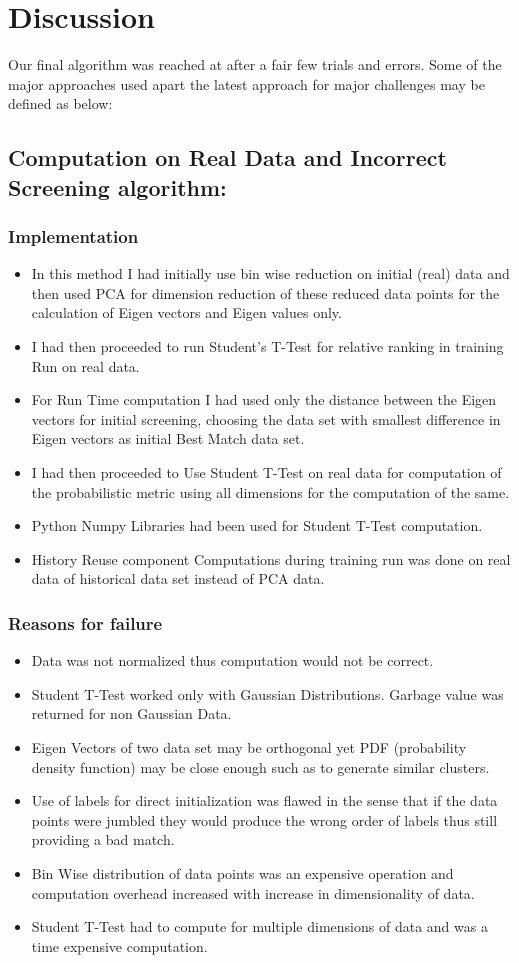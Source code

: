 \section{Discussion}
Our final algorithm was reached at after a fair few trials and errors. Some of the major approaches used apart the latest approach for major challenges may be defined as below:
\subsection{Computation on Real Data and Incorrect Screening algorithm:}
\subsubsection{Implementation}
\begin{itemize}
    \item In this method I had initially use bin wise reduction on initial (real) data and then used PCA for dimension reduction of these reduced data points for the calculation of Eigen vectors and Eigen values only.
    \item I had then proceeded to run Student’s T-Test for relative ranking in training Run on real data.
    \item For Run Time computation I had used only the distance between the Eigen vectors for initial screening, choosing the data set with smallest difference in Eigen vectors as initial Best Match data set.
    \item I had then proceeded to Use Student T-Test on real data for computation of the probabilistic metric using all dimensions for the computation of the same.
    \item Python Numpy Libraries had been used for Student T-Test computation.
    \item History Reuse component Computations during training run was done on real data of historical data set instead of PCA data.
\end{itemize}
\subsubsection{Reasons for failure}
\begin{itemize}
    \item Data was not normalized thus computation would not be correct.
    \item Student T-Test worked only with Gaussian Distributions. Garbage value was returned for non Gaussian Data.
    \item Eigen Vectors of two data set may be orthogonal yet PDF (probability density function) may be close enough such as to generate similar clusters.
    \item Use of labels for direct initialization was flawed in the sense that if the data points were jumbled they would produce the wrong order of labels thus still providing a bad match.
    \item Bin Wise distribution of data points was an expensive operation and computation overhead increased with increase in dimensionality of data.
    \item Student T-Test had to compute for multiple dimensions of data and was a time expensive computation.
\end{itemize}
